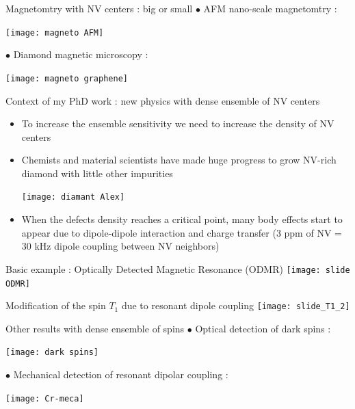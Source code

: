 \documentclass{beamer}
\begin{document}
\begin{frame}{Magnetomtry with NV centers : big or small}
$\bullet$ AFM nano-scale magnetomtry :
\begin{center}
\texttt{[image: magneto AFM]}
\end{center}


$\bullet$ Diamond magnetic microscopy :
\begin{center}
\texttt{[image: magneto graphene]}
\end{center}
\end{frame}

\begin{frame}{Context of my PhD work : new physics with dense ensemble of NV centers}
\begin{itemize}
\item To increase the ensemble sensitivity we need to increase the density of NV centers
\item Chemists and material scientists have made huge progress to grow NV-rich diamond with little other impurities 
\begin{center}
\texttt{[image: diamant Alex]}
\end{center}
\item When the defects density reaches a critical point, many body effects start to appear due to dipole-dipole interaction and charge transfer (3 ppm of NV = 30 kHz dipole coupling between NV neighbors)
\end{itemize}
\end{frame}
\begin{frame}{Basic example : Optically Detected Magnetic Resonance (ODMR)}
\centering
\texttt{[image: slide ODMR]}
\end{frame}

\begin{frame}{Modification of the spin $T_1$ due to resonant dipole coupling}
\centering
\texttt{[image: slide\_T1\_2]}
\end{frame}

\begin{frame}{Other results with dense ensemble of spins}
$\bullet$ Optical detection of dark spins :
\begin{center}
\texttt{[image: dark spins]}
\end{center}
$\bullet$ Mechanical detection of resonant dipolar coupling :
\begin{center}
\texttt{[image: Cr-meca]}
\end{center}
\end{frame}
\end{document}
